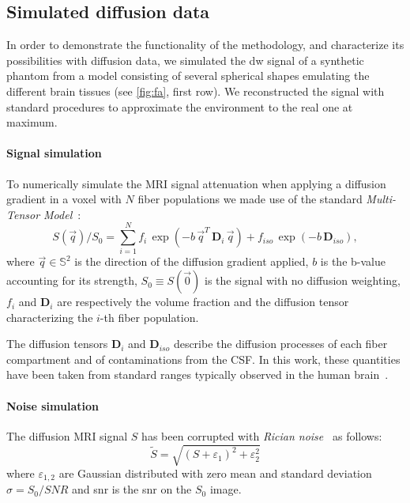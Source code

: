 %
\subsection{Simulated diffusion data}
%
In order to demonstrate the functionality of the methodology, 
and characterize its possibilities with diffusion data,
we simulated the \acs{dw} signal of a synthetic phantom from a model
consisting of several spherical shapes emulating
the different brain tissues (see \autoref{fig:fa}, first row). 
We reconstructed the signal with standard procedures to 
approximate the environment to the real one at maximum. \\

\paragraph{Signal simulation}
To numerically simulate the MRI signal attenuation when applying a diffusion 
gradient in a voxel with $N$ fiber populations we made use of the standard 
\emph{Multi-Tensor Model}~\cite{Tuch:2002aa}:
%
\begin{equation} 
\label{eqn:MultiTensor}
S(\vec{q}) / S_{0} = \sum_{i=1}^{N} f_{i} \, \exp{ \left( -b \, \vec{q}^{T} \, \mathbf{D}_i \, \vec{q}\right) } + f_{iso} \, \exp{ \left( -b \, \mathbf{D}_{iso} \right) } ,
\end{equation}
%
where $\vec{q} \in \mathbb{S}^2$ is the direction of the diffusion gradient 
applied, $b$ is the b-value accounting for its strength, $S_0 \equiv S(\vec{0})$ 
is the signal with no diffusion weighting, $f_i$ and $\mathbf{D}_i$ are 
respectively the volume fraction and the diffusion tensor characterizing the 
$i$-th fiber population.

The diffusion tensors $\mathbf{D}_i$ and $\mathbf{D}_{iso}$ describe the diffusion 
processes of each fiber compartment and of contaminations from the CSF. In this work, 
these quantities have been taken from standard ranges typically observed in the 
human brain~\cite{Canales-Rodriguez:2009aa}.

\paragraph{Noise simulation}
The diffusion MRI signal $S$ has been corrupted with 
\textit{Rician noise}~\cite{Gudbjartsson:1995aa} as follows:
%
\begin{equation}
	\tilde{S} = \sqrt{ (S + \varepsilon_1)^2 + \varepsilon_2^2 }
\end{equation}
%
where $\varepsilon_{1,2}$ are Gaussian distributed with zero mean
and standard deviation $\sigma = S_0 / \mathit{SNR}$ and \acs{snr}
is the \ac{snr} on the $S_0$ image.

